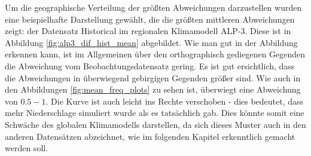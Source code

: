 Um die geographische Verteilung der größten Abweichungen darzustellen wurden eine beispielhafte Darstellung gewählt, die die größten mittleren Abweichungen zeigt: der Datensatz Historical im regionalen Klimamodell ALP-3. Diese ist in Abbildung \ref{fig:alp3_dif_hist_mean} abgebildet.
Wie man gut in der Abbildung erkennen kann, ist im Allgemeinen über den orthographisch gediegenen Gegenden die Abweichung vom Beobachtungsdatensatz gering. Es ist gut ersichtlich, dass die Abweichungen in überwiegend gebirgigen Gegenden größer sind. Wie auch in den Abbildungen \ref{fig:mean_freq_plots} zu sehen ist, überwiegt eine Abweichung von $0.5-1$. Die Kurve ist auch leicht ins Rechte verschoben - dies bedeutet, dass mehr Niederschlage simuliert wurde als es tatsächlich gab. Dies könnte somit eine Schwäche des globalen Klimamodells darstellen, da sich dieses Muster auch in den anderen Datensätzen abzeichnet, wie im folgenden Kapitel erkenntlich gemacht werden soll.

